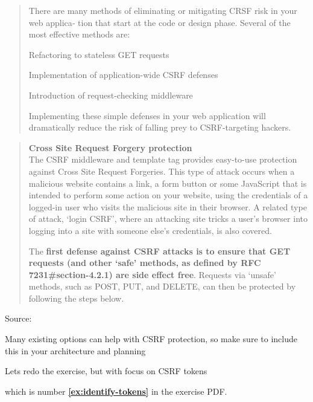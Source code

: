 \documentclass[Screen16to9,17pt]{foils}
\begin{document}
\begin{quote}
There are many methods of eliminating or mitigating CRSF risk in your web applica‐
tion that start at the code or design phase.
Several of the most effective methods are:
\begin{list2}
\item Refactoring to stateless GET requests
\item Implementation of application-wide CSRF defenses
\item Introduction of request-checking middleware
\end{list2}
Implementing these simple defenses in your web application will dramatically reduce
the risk of falling prey to CSRF-targeting hackers.
\end{quote}





\begin{quote}{\bf
Cross Site Request Forgery protection}\\
The CSRF middleware and template tag provides easy-to-use protection against Cross Site Request Forgeries. This type of attack occurs when a malicious website contains a link, a form button or some JavaScript that is intended to perform some action on your website, using the credentials of a logged-in user who visits the malicious site in their browser. A related type of attack, ‘login CSRF’, where an attacking site tricks a user’s browser into logging into a site with someone else’s credentials, is also covered.

The {\bf first defense against CSRF attacks is to ensure that GET requests (and other ‘safe’ methods, as defined by RFC 7231\#section-4.2.1) are side effect free}. Requests via ‘unsafe’ methods, such as POST, PUT, and DELETE, can then be protected by following the steps below.
\end{quote}
Source: 

\begin{list2}
\item Many existing options can help with CSRF protection, so make sure to include this in your architecture and planning
\end{list2}


\begin{center}
Lets redo the exercise, but with focus on CSRF tokens

{\bf\hlkbig {}}

which is number {\bf \ref{ex:identify-tokens}} in the exercise PDF.
\end{center}
\end{document}
